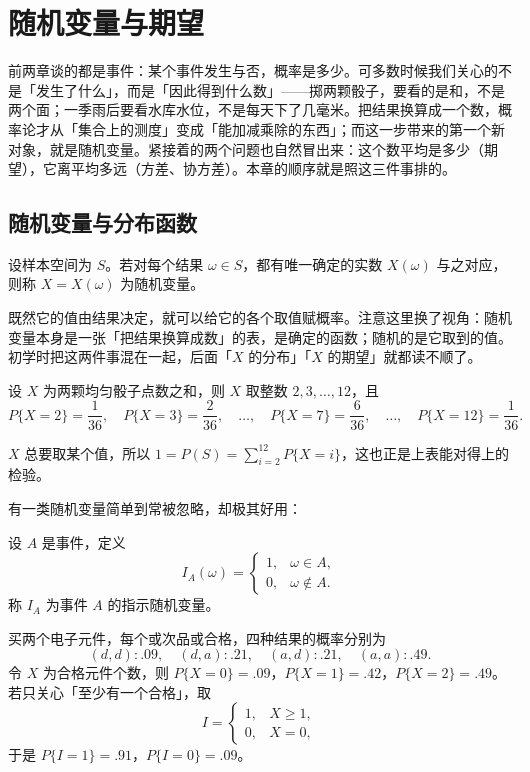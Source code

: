 \section{随机变量与期望}

前两章谈的都是事件：某个事件发生与否，概率是多少。可多数时候我们关心的不是「发生了什么」，而是「因此得到什么数」——掷两颗骰子，要看的是和，不是两个面；一季雨后要看水库水位，不是每天下了几毫米。把结果换算成一个数，概率论才从「集合上的测度」变成「能加减乘除的东西」；而这一步带来的第一个新对象，就是随机变量。紧接着的两个问题也自然冒出来：这个数平均是多少（期望），它离平均多远（方差、协方差）。本章的顺序就是照这三件事排的。

\subsection{随机变量与分布函数}

\begin{definition}[随机变量]
设样本空间为 $S$。若对每个结果 $\omega\in S$，都有唯一确定的实数 $X(\omega)$ 与之对应，则称 $X=X(\omega)$ 为随机变量。
\end{definition}

既然它的值由结果决定，就可以给它的各个取值赋概率。注意这里换了视角：随机变量本身是一张「把结果换算成数」的表，是确定的函数；随机的是它取到的值。初学时把这两件事混在一起，后面「$X$ 的分布」「$X$ 的期望」就都读不顺了。

\begin{example}[两枚骰子的和]
设 $X$ 为两颗均匀骰子点数之和，则 $X$ 取整数 $2,3,\dots,12$，且
\[
P\{X=2\}=\frac{1}{36},\quad P\{X=3\}=\frac{2}{36},\quad\dots,\quad P\{X=7\}=\frac{6}{36},\quad\dots,\quad P\{X=12\}=\frac{1}{36}.
\]
\end{example}

$X$ 总要取某个值，所以 $1=P(S)=\sum_{i=2}^{12}P\{X=i\}$，这也正是上表能对得上的检验。

有一类随机变量简单到常被忽略，却极其好用：

\begin{definition}[指示变量]
设 $A$ 是事件，定义
\[
I_A(\omega)=\begin{cases}1, & \omega\in A,\\ 0, & \omega\notin A .\end{cases}
\]
称 $I_A$ 为事件 $A$ 的指示随机变量。
\end{definition}

\begin{example}[指示变量的用法]
买两个电子元件，每个或次品或合格，四种结果的概率分别为
\[
(d,d):.09,\quad (d,a):.21,\quad (a,d):.21,\quad (a,a):.49 .
\]
令 $X$ 为合格元件个数，则 $P\{X=0\}=.09$，$P\{X=1\}=.42$，$P\{X=2\}=.49$。若只关心「至少有一个合格」，取
\[
I=\begin{cases}1, & X\ge 1,\\ 0, & X=0,\end{cases}
\]
于是 $P\{I=1\}=.91$，$P\{I=0\}=.09$。
\end{example}

